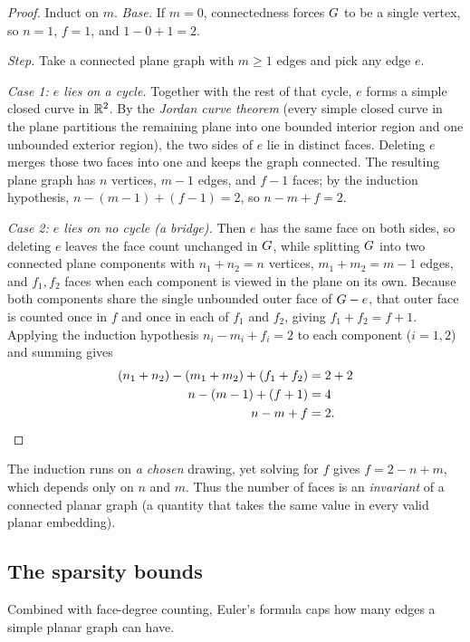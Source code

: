 \begin{proof}
Induct on $m$. \emph{Base.} If $m=0$, connectedness forces $G$ to be a single vertex, so
$n=1$, $f=1$, and $1-0+1=2$.

\emph{Step.} Take a connected plane graph with $m\ge 1$ edges and pick any edge $e$.

\emph{Case 1: $e$ lies on a cycle.} Together with the rest of that cycle, $e$ forms a
simple closed curve in $\mathbb{R}^2$. By the \emph{Jordan curve theorem} (every simple closed
curve in the plane partitions the remaining plane into one bounded interior region and one
unbounded exterior region), the two sides of $e$ lie in distinct faces. Deleting $e$ merges
those two faces into one and keeps the graph connected. The resulting plane graph has $n$
vertices, $m-1$ edges, and $f-1$ faces; by the induction hypothesis,
$n-(m-1)+(f-1)=2$, so $n-m+f=2$.

\emph{Case 2: $e$ lies on no cycle (a bridge).} Then $e$ has the same face on both sides,
so deleting $e$ leaves the face count unchanged in $G$, while splitting $G$ into two
connected plane components with $n_1+n_2=n$ vertices, $m_1+m_2=m-1$ edges, and $f_1,f_2$
faces when each component is viewed in the plane on its own. Because both components share
the single unbounded outer face of $G-e$, that outer face is counted once in $f$ and
once in each of $f_1$ and $f_2$, giving $f_1+f_2 = f+1$. Applying the induction hypothesis
$n_i - m_i + f_i = 2$ to each component ($i=1,2$) and summing gives
\begin{align*}
  (n_1 + n_2) - (m_1 + m_2) + (f_1 + f_2) &= 2 + 2 \\
  n - (m - 1) + (f + 1) &= 4 \\
  n - m + f &= 2. \qedhere
\end{align*}
\end{proof}

\begin{whybox}
The induction runs on \emph{a chosen} drawing, yet solving for $f$ gives $f = 2 - n + m$,
which depends only on $n$ and $m$. Thus the number of faces is an \emph{invariant} of a
connected planar graph (a quantity that takes the same value in every valid planar
embedding).
\end{whybox}

\subsection{The sparsity bounds}

Combined with face-degree counting, Euler's formula caps how many edges a simple planar
graph can have.

